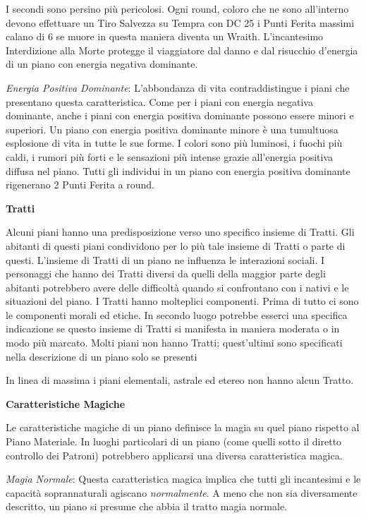 \documentclass[a4paper,twoside,openany]{book}
\begin{document}
\begin{multicols}{2}
I secondi sono persino più pericolosi. Ogni round, coloro che ne sono all'interno devono effettuare un Tiro Salvezza su Tempra con DC 25 i Punti Ferita massimi calano di 6 se muore in questa maniera diventa un Wraith. L'incantesimo Interdizione alla Morte protegge il viaggiatore dal danno e dal risucchio d'energia di un piano con energia negativa dominante.

\emph{Energia Positiva Dominante}: L'abbondanza di vita contraddistingue i piani che presentano questa caratteristica. Come per i piani con energia negativa dominante, anche i piani con energia positiva dominante possono essere minori e superiori.
Un piano con energia positiva dominante minore è una tumultuosa esplosione di vita in tutte le sue forme. I colori sono più luminosi, i fuochi più caldi, i rumori più forti e le sensazioni più intense grazie all'energia positiva diffusa nel piano. Tutti gli individui in un piano con energia positiva dominante rigenerano 2 Punti Ferita a round.

\medskip

\textbf{Tratti}

\medskip

Alcuni piani hanno una predisposizione verso uno specifico insieme di Tratti. Gli abitanti di questi piani condividono per lo più tale insieme di Tratti o parte di questi. L'insieme di Tratti di un piano ne influenza le interazioni sociali. I personaggi che hanno dei Tratti diversi da quelli della maggior parte degli abitanti potrebbero avere delle difficoltà quando si confrontano con i nativi e le situazioni del piano. I Tratti hanno molteplici componenti. Prima di tutto ci sono le componenti morali ed etiche. In secondo luogo potrebbe esserci una specifica indicazione se questo insieme di Tratti si manifesta in maniera moderata o in modo più marcato. Molti piani non hanno Tratti; quest'ultimi sono specificati nella descrizione di un piano solo se presenti

In linea di massima i piani elementali, astrale ed etereo non hanno alcun Tratto.

\medskip

\textbf{Caratteristiche Magiche}

\medskip

Le caratteristiche magiche di un piano definisce la magia su quel piano rispetto al Piano Materiale. In luoghi particolari di un piano (come quelli sotto il diretto controllo dei Patroni) potrebbero applicarsi una diversa caratteristica magica.

\emph{Magia Normale}: Questa caratteristica magica implica che tutti gli incantesimi e le capacità soprannaturali agiscano \emph{normalmente}. A meno che non sia diversamente descritto, un piano si presume che abbia il tratto magia normale.


\end{multicols}
\end{document}

